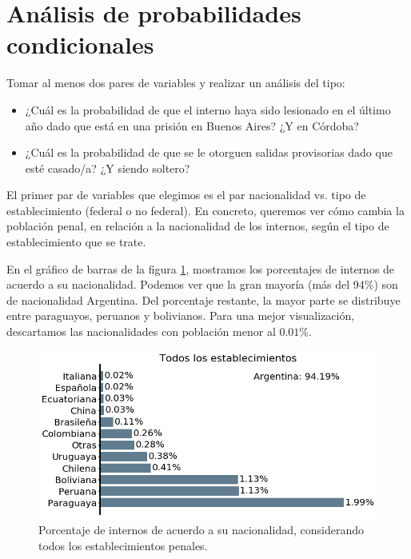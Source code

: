 \documentclass[10pt]{article}
\begin{document}
\section{Análisis de probabilidades condicionales}

Tomar al menos dos pares de variables y realizar un análisis del tipo:

\begin{itemize}
	\item ¿Cuál es la probabilidad de que el interno haya sido lesionado en el último año dado que está en una prisión en Buenos Aires? ¿Y en Córdoba?
	\item ¿Cuál es la probabilidad de que se le otorguen salidas provisorias dado que esté casado/a? ¿Y siendo soltero?
\end{itemize}

El primer par de variables que elegimos es el par nacionalidad vs. tipo de establecimiento (federal o no federal). En concreto, queremos ver c\'omo cambia la poblaci\'on penal, en relaci\'on a la nacionalidad de los internos, seg\'un el tipo de establecimiento que se trate. 

En el gr\'afico de barras de la figura \ref{fig:nacionalidad_todos}, mostramos los porcentajes de internos de acuerdo a su nacionalidad. Podemos ver que la gran mayor\'ia (m\'as del 94\%) son de nacionalidad Argentina. Del porcentaje restante, la mayor parte se distribuye entre paraguayos, peruanos y bolivianos. Para una mejor visualizaci\'on, descartamos las nacionalidades con poblaci\'on menor al $0.01\%$.

\begin{figure}[H]
	\centering
\includegraphics[scale=0.40]{graficos/nacionalidad_bar.png}
	\caption{Porcentaje de internos de acuerdo a su nacionalidad, considerando todos los establecimientos penales.\label{fig:nacionalidad_todos}}
\end{figure}
\end{document}
